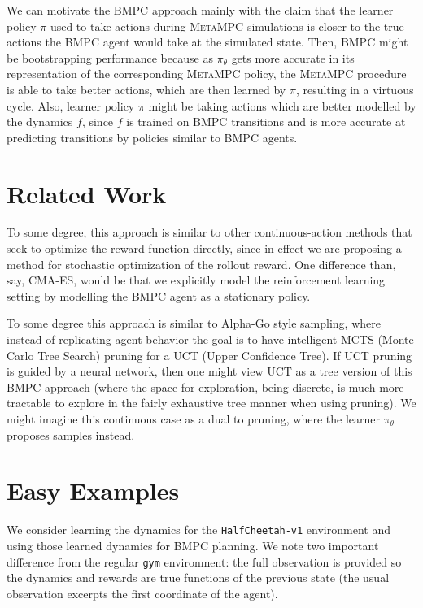 \documentclass{article}
\begin{document}
We can motivate the \textsc{BMPC} approach mainly with the claim that the learner policy $\pi$ used to take actions during \textsc{MetaMPC} simulations is closer to the true actions the \textsc{BMPC} agent would take at the simulated state. Then, \textsc{BMPC} might be bootstrapping performance because as $\pi_\theta$ gets more accurate in its representation of the corresponding \textsc{MetaMPC} policy, the \textsc{MetaMPC} procedure is able to take better actions, which are then learned by $\pi$, resulting in a virtuous cycle. Also, learner policy $\pi$ might be taking actions which are better modelled by the dynamics $f$, since $f$ is trained on \textsc{BMPC} transitions and is more accurate at predicting transitions by policies similar to \textsc{BMPC} agents.


\section{Related Work}

To some degree, this approach is similar to other continuous-action methods that seek to optimize the reward function directly, since in effect we are proposing a method for stochastic optimization of the rollout reward. One difference than, say, CMA-ES, would be that we explicitly model the reinforcement learning setting by modelling the \textsc{BMPC} agent as a stationary policy.

To some degree this approach is similar to Alpha-Go style sampling, where instead of replicating agent behavior the goal is to have intelligent MCTS (Monte Carlo Tree Search) pruning for a UCT (Upper Confidence Tree). If UCT pruning is guided by a neural network, then one might view UCT as a tree version of this \textsc{BMPC} approach (where the space for exploration, being discrete, is much more tractable to explore in the fairly exhaustive tree manner when using pruning). We might imagine this continuous case as a dual to pruning, where the learner $\pi_\theta$ proposes samples instead.

\section{Easy Examples}

We consider learning the dynamics for the \texttt{HalfCheetah-v1} environment and using those learned dynamics for \textsc{BMPC} planning. We note two important difference from the regular \texttt{gym} environment: the full observation is provided so the dynamics and rewards are true functions of the previous state (the usual observation excerpts the first coordinate of the agent).
\end{document}
